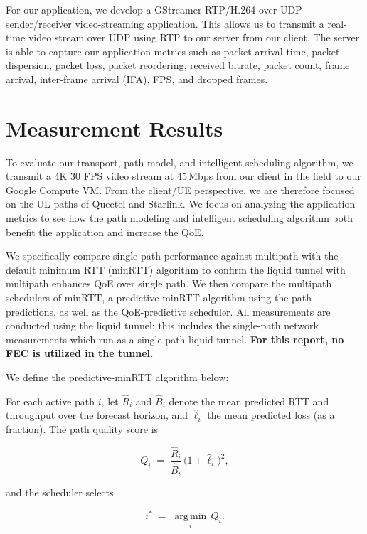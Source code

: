 \documentclass[sigconf,nonacm]{acmart}
\begin{document}
For our application, we develop a GStreamer RTP/H.264-over-UDP sender/receiver video-streaming application. This allows us to transmit a real-time video stream over UDP using RTP to our server from our client. The server is able to capture our application metrics such as packet arrival time, packet dispersion, packet loss, packet reordering, received bitrate, packet count, frame arrival, inter-frame arrival (IFA), FPS, and dropped frames.

\section{Measurement Results}
\label{sec:eval}

To evaluate our transport, path model, and intelligent scheduling algorithm, we transmit a 4K 30 FPS video stream at 45\,Mbps from our client in the field to our Google Compute VM. From the client/UE perspective, we are therefore focused on the UL paths of Quectel and Starlink. We focus on analyzing the application metrics to see how the path modeling and intelligent scheduling algorithm both benefit the application and increase the QoE.

We specifically compare single path performance against multipath with the default minimum RTT (minRTT) algorithm to confirm the liquid tunnel with multipath enhances QoE over single path. We then compare the multipath schedulers of minRTT, a predictive-minRTT algorithm using the path predictions, as well as the QoE-predictive scheduler. All measurements are conducted using the liquid tunnel; this includes the single-path network measurements which run as a single path liquid tunnel. \textbf{For this report, no FEC is utilized in the tunnel.}

We define the predictive-minRTT algorithm below:

For each active path $i$, let $\hat{R}_i$ and $\hat{B}_i$ denote the mean predicted RTT
and throughput over the forecast horizon, and $\hat{\ell}_i$ the mean predicted loss
(as a fraction). The path quality score is

\begin{equation}
    Q_i \;=\; \frac{\hat{R}_i}{\hat{B}_i} \,\big(1 + \hat{\ell}_i\big)^{2},
\end{equation}

and the scheduler selects

\begin{equation}
    i^{*} \;=\; \operatorname*{arg\,min}_i \, Q_i .
\end{equation}
\end{document}
